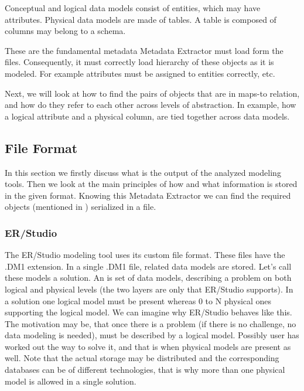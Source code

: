 \label{main_modeled_objects}
Conceptual and logical data models consist of entities, which may have attributes.
Physical data models are made of tables. A table is composed of columns may belong to a schema.

These are the fundamental metadata Metadata Extractor must load form the files. 
Consequently, it must correctly load hierarchy of these objects as it is modeled. For example attributes must be assigned to entities correctly, etc.

Next, we will look at how to find the pairs of objects that are in maps-to relation, and how do they refer to each other across levels of abstraction.
In example, how a logical attribute and a physical column, are tied together across data models.

\subsection{File Format}

In this section we firstly discuss what is the output of the analyzed modeling tools. Then we look at the main principles of how and what information is stored in the given format. Knowing this Metadata Extractor we can find the required objects (mentioned in ) serialized in a file.

\subsubsection{ER/Studio}
\label{subsec:dm1_format}

The ER/Studio modeling tool uses its custom file format. These files have the .DM1 extension. 
In a single .DM1 file, related data models are stored. Let's call these models a solution. An  is set of data models, describing a problem on both logical and physical levels (the two layers are only that ER/Studio supports). 
In a solution one logical model must be present whereas 0 to N physical ones supporting the logical model.
We can imagine why ER/Studio behaves like this. The motivation may be, that once there is a problem (if there is no challenge, no data modeling is needed), must be described by a logical model. 
Possibly user has worked out the way to solve it, and that is when physical models are present as well.
Note that the actual storage may be distributed and the corresponding databases can be of different technologies, that is why more than one physical model is allowed in a single solution.

